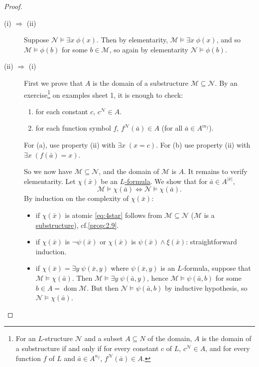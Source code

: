 \documentclass{article}
\let\models\vDash
\DeclareMathOperator{\dom}{dom}
\begin{document}
\begin{proof}\leavevmode
  \begin{description}
    \item [(i) $\Rightarrow$ (ii)] Suppose $\mathcal{N} \models \exists x \; \phi(x)$.
      Then by elementarity, $\mathcal{M} \models \exists x \; \phi(x)$, and so $\mathcal{M} \models \phi(b)$ for some $b \in \mathcal{M}$, so again by elementarity $\mathcal{N} \models \phi(b)$.
    \item [(ii) $\Rightarrow$ (i)] First we prove that $A$ is the domain of a substructure $\mathcal{M} \subseteq \mathcal{N}$.
      By an exercise\footnote{For an $L$-structure $\mathcal{N}$ and a subset $A \subseteq N$ of the domain, $A$ is the domain of a substructure if and only if for every constant $c$ of $L$, $c^\mathcal{N} \in A$, and for every function $f$ of $L$ and $\bar a \in A^{n_f}$, $f^\mathcal{N}(\bar a) \in A$.} on examples sheet 1, it is enough to check:
      \begin{enumerate}[label=(\alph*)]
        \item for each constant $c$, $c^\mathcal{N} \in A$.
        \item for each function symbol $f$, $f^{\mathcal{N}}(\bar{a}) \in A$ (for all $\bar{a} \in A^{m_f}$).
      \end{enumerate}
      For (a), use property (ii) with $\exists x\; (x = c)$. For (b) use property (ii) with $\exists x\; (f(\bar{a}) = x)$.

      So we now have $\mathcal{M} \subseteq \mathcal{N}$, and the domain of $\mathcal{M}$ is $A$.
      It remains to verify elementarity.
      Let $\chi(\bar{x})$ be an \hyperlink{def:form}{$L$-formula}.
      We show that for $\bar{a} \in A^{|\bar{x}|}$,
      \begin{equation*}
        \mathcal{M} \models \chi(\bar{a}) \iff \mathcal{N} \models \chi(\bar{a}). \tag{$*$} \label{eq:4star}
      \end{equation*}
      By induction on the complexity of $\chi(\bar{x})$:
      \begin{itemize}[label=--]
        \item if $\chi(\bar{x})$ is atomic \eqref{eq:4star} follows from $\mathcal{M} \subseteq \mathcal{N}$ ($\mathcal{M}$ is a \hyperlink{def:subs}{substructure}), cf.\@ \cref{prop:2.9}.
        \item if $\chi(\bar{x})$ is $\neg \psi(\bar{x})$ or $\chi(\bar{x})$ is $\psi(\bar{x}) \wedge \xi(\bar{x})$: straightforward induction.
        \item if $\chi(\bar{x}) = \exists y \; \psi(\bar{x},y)$ where $\psi(\bar{x},y)$ is an $L$-formula, suppose that $\mathcal{M} \models \chi(\bar{a})$.
          Then $\mathcal{M} \models \exists y \; \psi(\bar{a}, y)$, hence $\mathcal{M} \models \psi(\bar{a},b)$ for some $b \in A = \dom \mathcal{M}$.
          But then $\mathcal{N} \models \psi(\bar{a},b)$ by inductive hypothesis, so $\mathcal{N} \models \chi(\bar{a})$.


\end{itemize}
\end{description}
\end{proof}
\end{document}
